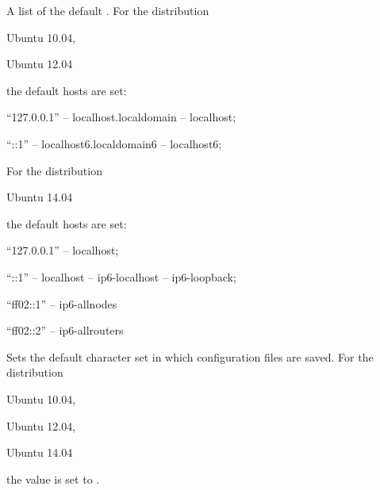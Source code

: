 
A list of the default .
For the distribution
\begin{inparaitem}
\item[\TheDistribution{ubuntu}] Ubuntu 10.04,
\item[\TheDistribution{ubuntu}] Ubuntu 12.04
\end{inparaitem}
the default hosts are set:
\begin{compactitem}
\item ``127.0.0.1'' -- localhost.localdomain -- localhost;
\item ``::1'' -- localhost6.localdomain6 -- localhost6;
\end{compactitem}

For the distribution
\begin{inparaitem}
\item[\TheDistribution{ubuntu}] Ubuntu 14.04
\end{inparaitem}
the default hosts are set:
\begin{compactitem}
\item ``127.0.0.1'' -- localhost;
\item ``::1'' -- localhost -- ip6-localhost -- ip6-loopback;
\item ``ff02::1'' -- ip6-allnodes
\item ``ff02::2'' -- ip6-allrouters
\end{compactitem}


Sets the default character set  in which configuration files are 
saved. For the distribution
\begin{inparaitem}
\item[\TheDistribution{ubuntu}] Ubuntu 10.04,
\item[\TheDistribution{ubuntu}] Ubuntu 12.04,
\item[\TheDistribution{ubuntu}] Ubuntu 14.04
\end{inparaitem}
the value is set to .
